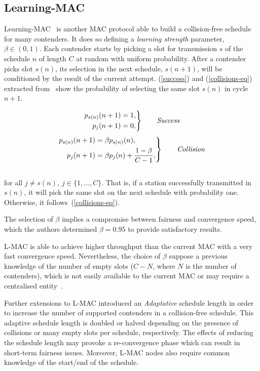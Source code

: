 \documentclass[a4paper,journal]{IEEEtran}
\begin{document}
\subsection{Learning-MAC}

Learning-MAC~\cite{L_MAC} is another MAC protocol able to build a collision-free schedule for many contenders. It does so defining a \emph{learning strength} parameter, $\beta\in(0,1)$. Each contender starts by picking a slot for transmission $s$ of the schedule $n$ of length $C$ at random with uniform probability. After a contender picks slot $s(n)$, its selection in the next schedule, $s(n+1)$, will be conditioned by the result of the current attempt. (\ref{success}) and (\ref{collisions-eq}) extracted from~\cite{L_MAC} show the probability of selecting the same slot $s(n)$ in cycle $n+1$.

\begin{equation} \label{success}
		\left. \begin{aligned}
			p_{s(n)}(n+1)&=1,\\
			p_{j}(n+1)&=0,
		\end{aligned}
	\right\}
	\qquad \text{\emph{Success}}
\end{equation}
\begin{equation} \label{collisions-eq}
	\left. \begin{aligned}
			p_{s(n)}(n+1)&=\beta p_{s(n)}(n),\\
			p_{j}(n+1)&=\beta p_{j}(n)+\frac{1-\beta}{C -1},
		\end{aligned}
	\right\}
	\qquad \text{\emph{Collision}}
\end{equation}
\\
for all $j\neq s(n),~j\in \{1,\dots ,C\}$. That is, if a station successfully transmitted in $s(n)$, it will pick the same slot on the next schedule with probability one. Otherwise, it follows~(\ref{collisions-eq}).

The selection of $\beta$ implies a compromise between fairness and convergence speed, which the authors determined $\beta=0.95$ to provide satisfactory results.

L-MAC is able to achieve higher throughput than the current MAC with a very fast convergence speed. Nevertheless, the choice of $\beta$ suppose a previous knowledge of the number of empty slots ($C-N$, where $N$ is the number of contenders), which is not easily available to the current MAC or may require a centralised entity~\cite{barcelo2011tcf}.

Further extensions to L-MAC introduced an \emph{Adaptative} schedule length in order to increase the number of supported contenders in a collision-free schedule. This adaptive schedule length is doubled or halved depending on the presence of collisions or many empty slots per schedule, respectively. The effects of reducing the schedule length may provoke a re-convergence phase which can result in short-term fairness issues. Moreover, L-MAC nodes also require common knowledge of the start/end of the schedule.
\end{document}
